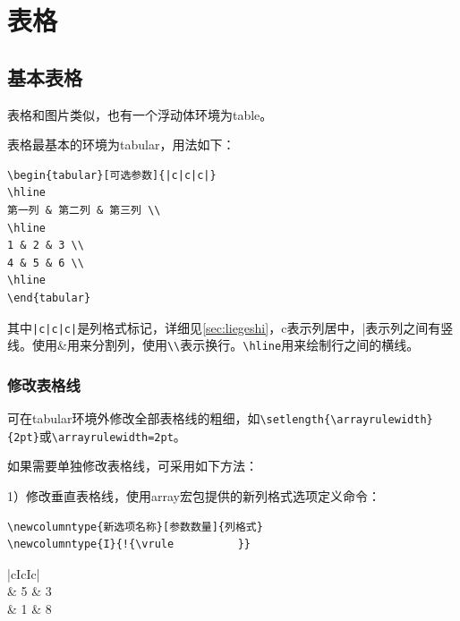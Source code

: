 \chapter{表格}\label{chap:table}

\section{基本表格}\label{sec:basic-table}

表格和图片类似，也有一个浮动体环境为table。

表格最基本的环境为tabular，用法如下：
\begin{lstlisting}
\begin{tabular}[可选参数]{|c|c|c|}
\hline
第一列 & 第二列 & 第三列 \\
\hline
1 & 2 & 3 \\
4 & 5 & 6 \\
\hline
\end{tabular}
\end{lstlisting}

其中\lstinline{|c|c|c|}是列格式标记，详细见\ref{sec:liegeshi}，c表示列居中，|表示列之间有竖线。使用\&用来分割列，使用\lstinline|\\|表示换行。\lstinline{\hline}用来绘制行之间的横线。

\subsection{修改表格线}\label{sec:modify-table-line}
可在tabular环境外修改全部表格线的粗细，如\lstinline|\setlength{\arrayrulewidth}{2pt}|或\lstinline{\arrayrulewidth=2pt}。

如果需要单独修改表格线，可采用如下方法：

1）修改垂直表格线，使用array宏包提供的新列格式选项定义命令：
\begin{lstlisting}
\newcolumntype{新选项名称}[参数数量]{列格式}
\newcolumntype{I}{!{\vrule width 2pt}}
\end{lstlisting}
\begin{codeshow}
    \centering
    \begin{tabular}{|cIcIc|}
        \hline
         \\
         & 5 & 3                     \\
         & 1 & 8                     \\
        \hline
    \end{tabular}
\end{codeshow}

